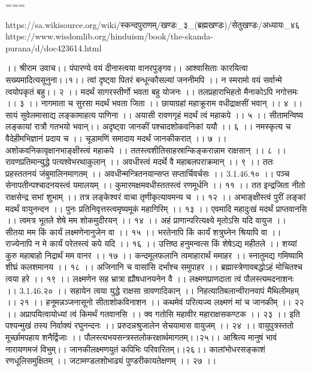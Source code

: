 ===

https://sa.wikisource.org/wiki/स्कन्दपुराणम्/खण्डः_३_(ब्रह्मखण्डः)/सेतुखण्डः/अध्यायः_४६
https://www.wisdomlib.org/hinduism/book/the-skanda-purana/d/doc423614.html

।। श्रीराम उवाच।।
पंपारण्ये वयं दीनास्त्वया वानरपुङ्गव।।
आश्वासिताः कारयित्वा सख्यमादित्यसूनुना।।१।।
त्वां दृष्ट्वा पितरं बन्धून्कौसल्यां जननीमपि ।।
न स्मरामो वयं सर्वान्मे त्वयोपकृतं बहु।। २ ।।
मदर्थं सागरस्तीर्णो भवता बहु योजनः ।।
तलप्रहाराभिहतो मैनाकोऽपि नगोत्तमः ।। ३ ।।
नागमाता च सुरसा मदर्थं भवता जिता ।।
छायाग्रहां महाक्रूराम वधीद्राक्षसीं भवान् ।। ४ ।।
सायं सुवेलमासाद्य लङ्कामाहत्य पाणिना ।।
अयासी रावणगृहं मदर्थं त्वं महाकपे ।। ५ ।।
सीतामन्विष्य लङ्कायां रात्रौ गतभयो भवान्।।
अदृष्ट्वा जानकीं पश्चादशोकवनिकां ययौ ।। ६ ।।
नमस्कृत्य च वैदेहीमभिज्ञानं प्रदाय च ।।
चूडामणिं समादाय मदर्थं जानकीकरात् ।। ७ ।।
अशोकवनिकावृक्षानभाङ्क्षीस्त्वं महाकपे ।।
ततस्त्वशीतिसाहस्रान्किङ्करान्नाम राक्षसान् ।। ८ ।।
रावणप्रतिमान्युद्धे पत्यश्वेभरथाकुलान् ।।
अवधीस्त्वं मदर्थे वै महाबलपराक्रमान् ।। ९ ।।
ततः प्रहस्ततनयं जंबुमालिनमागतम् ।।
अवधीन्मन्त्रितनयान्सप्त सप्तार्चिवर्चसः ।। 3.1.46.१० ।।
पञ्च सेनापतीन्पश्चादनयस्त्वं यमालयम् ।।
कुमारमक्षमवधीस्ततस्त्वं रणमूर्धनि ।। ११ ।।
तत इन्द्रजिता नीतो राक्षसेन्द्र सभां शुभाम् ।।
तत्र लङ्केश्वरं वाचा तृणीकृत्यावमन्य च ।। १२ ।।
अभाङ्क्षीस्त्वं पुरीं लङ्कां मदर्थं वायुनन्दन ।।
पुनः प्रतिनिवृत्तस्त्वमृष्यमूकं महागिरिम् ।। १३ ।।
एवमादि महादुःखं मदर्थं प्राप्तवानसि ।।
त्वमत्र भूतले शेषे मम शोकमुदीरयन् ।। १४ ।।
अहं प्राणान्परित्यक्ष्ये मृतोऽसि यदि वायुज ।।
सीतया मम किं कार्यं लक्ष्मणेनानुजेन वा ।। १५ ।।
भरतेनापि किं कार्यं शत्रुघ्नेन श्रियापि वा ।।
राज्येनापि न मे कार्यं परेतस्त्वं कपे यदि ।। १६ ।।
उत्तिष्ठ हनुमन्वत्स किं शेषेऽद्य महीतले ।।
शय्यां कुरु महाबाहो निद्रार्थं मम वानर ।। १७ ।।
कन्दमूलफलानि त्वमाहारार्थं ममाहर ।।
स्नातुमद्य गमिष्यामि शीघ्रं कलशमानय ।। १८ ।।
अजिनानि च वासांसि दर्भांश्च समुपाहर ।।
ब्रह्मास्त्रेणावबद्धोऽहं मोचितश्च त्वया हरे ।। १९ ।।
लक्ष्मणेन सह भ्रात्रा ह्यौषधानयनेन वै ।।
लक्ष्मणप्राणदाता त्वं पौलस्त्यमदनाशनः ।। 3.1.46.२० ।।
सहायेन त्वया युद्धे राक्षसा न्रावणादिकान् ।।
निहत्यातिबलान्वीरानवापं मैथिलीमहम् ।। २१ ।।
हनूमन्नञ्जनासूनो सीताशोकविनाशन ।।
कथमेवं परित्यज्य लक्ष्मणं मां च जानकीम् ।। २२ ।।
अप्रापयित्वायोध्यां त्वं किमर्थं गतवानसि ।।
क्व गतोसि महावीर महाराक्षसकण्टक ।। २३ ।।
इति पश्यन्मुखं तस्य निर्वाक्यं रघुनन्दनः ।।
प्ररुदन्नश्रुजालेन सेचयामास वायुजम् ।। २४ ।।
वायुपुत्रस्ततो मूर्च्छामपहाय शनैर्द्विजाः ।।
पौलस्त्यभयसन्त्रस्तलोकरक्षार्थमागतम्।।२५।।
आश्रित्य मानुषं भावं नारायणमजं विभुम्।।
जानकीलक्ष्मणयुतं कपिभिः परिवारितम्।।२६।।
कालांभोधरसङ्काशं रणधूलिसमुक्षितम् ।।
जटामण्डलशोभाढ्यं पुण्डरीकायतेक्षणम् ।। २७ ।।
